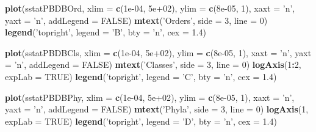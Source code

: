\documentclass[]{article}
\newenvironment{Shaded}{\begin{snugshade}}{\end{snugshade}}
\newcommand{\KeywordTok}[1]{\textcolor[rgb]{0.13,0.29,0.53}{\textbf{#1}}}
\newcommand{\DataTypeTok}[1]{\textcolor[rgb]{0.13,0.29,0.53}{#1}}
\newcommand{\DecValTok}[1]{\textcolor[rgb]{0.00,0.00,0.81}{#1}}
\newcommand{\FloatTok}[1]{\textcolor[rgb]{0.00,0.00,0.81}{#1}}
\newcommand{\StringTok}[1]{\textcolor[rgb]{0.31,0.60,0.02}{#1}}
\newcommand{\OtherTok}[1]{\textcolor[rgb]{0.56,0.35,0.01}{#1}}
\newcommand{\OperatorTok}[1]{\textcolor[rgb]{0.81,0.36,0.00}{\textbf{#1}}}
\newcommand{\NormalTok}[1]{#1}
\begin{document}
\begin{Shaded}
\begin{Highlighting}[]
{\KeywordTok{plot}\NormalTok{(sstatPBDBOrd, }\DataTypeTok{xlim =} \KeywordTok{c}\NormalTok{(}\FloatTok{1e-04}\NormalTok{, }\FloatTok{5e+02}\NormalTok{), }\DataTypeTok{ylim =} \KeywordTok{c}\NormalTok{(}\FloatTok{8e-05}\NormalTok{, }\DecValTok{1}\NormalTok{), }\DataTypeTok{xaxt =} \StringTok{'n'}\NormalTok{, }\DataTypeTok{yaxt =} \StringTok{'n'}\NormalTok{, }
     \DataTypeTok{addLegend =} \OtherTok{FALSE}\NormalTok{)}
\KeywordTok{mtext}\NormalTok{(}\StringTok{'Orders'}\NormalTok{, }\DataTypeTok{side =} \DecValTok{3}\NormalTok{, }\DataTypeTok{line =} \DecValTok{0}\NormalTok{)}
\KeywordTok{legend}\NormalTok{(}\StringTok{'topright'}\NormalTok{, }\DataTypeTok{legend =} \StringTok{'B'}\NormalTok{, }\DataTypeTok{bty =} \StringTok{'n'}\NormalTok{, }\DataTypeTok{cex =} \FloatTok{1.4}\NormalTok{)}

\KeywordTok{plot}\NormalTok{(sstatPBDBCls, }\DataTypeTok{xlim =} \KeywordTok{c}\NormalTok{(}\FloatTok{1e-04}\NormalTok{, }\FloatTok{5e+02}\NormalTok{), }\DataTypeTok{ylim =} \KeywordTok{c}\NormalTok{(}\FloatTok{8e-05}\NormalTok{, }\DecValTok{1}\NormalTok{), }\DataTypeTok{xaxt =} \StringTok{'n'}\NormalTok{, }\DataTypeTok{yaxt =} \StringTok{'n'}\NormalTok{, }
     \DataTypeTok{addLegend =} \OtherTok{FALSE}\NormalTok{)}
\KeywordTok{mtext}\NormalTok{(}\StringTok{'Classes'}\NormalTok{, }\DataTypeTok{side =} \DecValTok{3}\NormalTok{, }\DataTypeTok{line =} \DecValTok{0}\NormalTok{)}
\KeywordTok{logAxis}\NormalTok{(}\DecValTok{1}\OperatorTok{:}\DecValTok{2}\NormalTok{, }\DataTypeTok{expLab =} \OtherTok{TRUE}\NormalTok{)}
\KeywordTok{legend}\NormalTok{(}\StringTok{'topright'}\NormalTok{, }\DataTypeTok{legend =} \StringTok{'C'}\NormalTok{, }\DataTypeTok{bty =} \StringTok{'n'}\NormalTok{, }\DataTypeTok{cex =} \FloatTok{1.4}\NormalTok{)}

\KeywordTok{plot}\NormalTok{(sstatPBDBPhy, }\DataTypeTok{xlim =} \KeywordTok{c}\NormalTok{(}\FloatTok{1e-04}\NormalTok{, }\FloatTok{5e+02}\NormalTok{), }\DataTypeTok{ylim =} \KeywordTok{c}\NormalTok{(}\FloatTok{8e-05}\NormalTok{, }\DecValTok{1}\NormalTok{), }\DataTypeTok{xaxt =} \StringTok{'n'}\NormalTok{, }\DataTypeTok{yaxt =} \StringTok{'n'}\NormalTok{, }
     \DataTypeTok{addLegend =} \OtherTok{FALSE}\NormalTok{)}
\KeywordTok{mtext}\NormalTok{(}\StringTok{'Phyla'}\NormalTok{, }\DataTypeTok{side =} \DecValTok{3}\NormalTok{, }\DataTypeTok{line =} \DecValTok{0}\NormalTok{)}
\KeywordTok{logAxis}\NormalTok{(}\DecValTok{1}\NormalTok{, }\DataTypeTok{expLab =} \OtherTok{TRUE}\NormalTok{)}
\KeywordTok{legend}\NormalTok{(}\StringTok{'topright'}\NormalTok{, }\DataTypeTok{legend =} \StringTok{'D'}\NormalTok{, }\DataTypeTok{bty =} \StringTok{'n'}\NormalTok{, }\DataTypeTok{cex =} \FloatTok{1.4}\NormalTok{)}

}
\end{Highlighting}
\end{Shaded}
\end{document}
